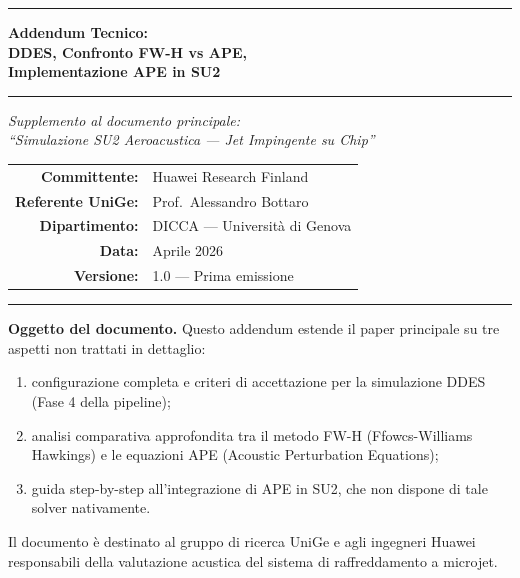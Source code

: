 \documentclass[11pt,a4paper]{article}
\begin{document}

\begin{titlepage}
  \centering
  \vspace*{1.5cm}

  {\color{huaweiblue}\rule{\linewidth}{1.5pt}}
  \vspace{0.6cm}

  {\huge\bfseries\color{huaweiblue}
    Addendum Tecnico:\\[0.4em]
    DDES, Confronto FW-H vs APE,\\[0.3em]
    Implementazione APE in SU2}

  \vspace{0.5cm}
  {\color{midblue}\rule{\linewidth}{0.6pt}}
  \vspace{0.8cm}

  {\large\itshape Supplemento al documento principale:\\
  \textit{``Simulazione SU2 Aeroacustica — Jet Impingente su Chip''}}

  \vspace{1.2cm}

  \begin{tabular}{rl}
    \textbf{Committente:} & Huawei Research Finland \\[4pt]
    \textbf{Referente UniGe:} & Prof.\ Alessandro Bottaro \\[4pt]
    \textbf{Dipartimento:} & DICCA — Università di Genova \\[4pt]
    \textbf{Data:} & Aprile 2026 \\[4pt]
    \textbf{Versione:} & 1.0 — Prima emissione \\
  \end{tabular}

  \vspace{1.5cm}
  {\color{huaweiblue}\rule{\linewidth}{1.5pt}}

  \vspace{1.0cm}
  {\normalsize
  \textbf{Oggetto del documento.} Questo addendum estende il paper principale
  su tre aspetti non trattati in dettaglio:
  \begin{enumerate}
    \item configurazione completa e criteri di accettazione per la simulazione DDES (Fase 4 della pipeline);
    \item analisi comparativa approfondita tra il metodo FW-H (Ffowcs-Williams Hawkings)
          e le equazioni APE (Acoustic Perturbation Equations);
    \item guida step-by-step all'integrazione di APE in SU2, che non dispone
          di tale solver nativamente.
  \end{enumerate}
  Il documento è destinato al gruppo di ricerca UniGe e agli ingegneri Huawei
  responsabili della valutazione acustica del sistema di raffreddamento a microjet.}

\end{titlepage}
\end{document}
